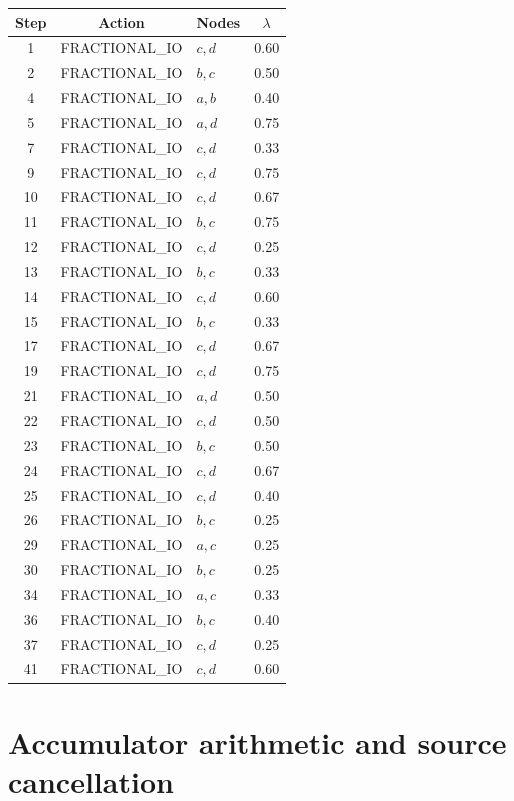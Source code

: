\documentclass[11pt]{article}
\begin{document}
\begin{longtable}{cclc}
\toprule
Step & Action & Nodes & \(\lambda\)\\
\midrule
\endhead
1  & FRACTIONAL\_IO & \(c,d\) & 0.60\\
2  & FRACTIONAL\_IO & \(b,c\) & 0.50\\
4  & FRACTIONAL\_IO & \(a,b\) & 0.40\\
5  & FRACTIONAL\_IO & \(a,d\) & 0.75\\
7  & FRACTIONAL\_IO & \(c,d\) & 0.33\\
9  & FRACTIONAL\_IO & \(c,d\) & 0.75\\
10 & FRACTIONAL\_IO & \(c,d\) & 0.67\\
11 & FRACTIONAL\_IO & \(b,c\) & 0.75\\
12 & FRACTIONAL\_IO & \(c,d\) & 0.25\\
13 & FRACTIONAL\_IO & \(b,c\) & 0.33\\
14 & FRACTIONAL\_IO & \(c,d\) & 0.60\\
15 & FRACTIONAL\_IO & \(b,c\) & 0.33\\
17 & FRACTIONAL\_IO & \(c,d\) & 0.67\\
19 & FRACTIONAL\_IO & \(c,d\) & 0.75\\
21 & FRACTIONAL\_IO & \(a,d\) & 0.50\\
22 & FRACTIONAL\_IO & \(c,d\) & 0.50\\
23 & FRACTIONAL\_IO & \(b,c\) & 0.50\\
24 & FRACTIONAL\_IO & \(c,d\) & 0.67\\
25 & FRACTIONAL\_IO & \(c,d\) & 0.40\\
26 & FRACTIONAL\_IO & \(b,c\) & 0.25\\
29 & FRACTIONAL\_IO & \(a,c\) & 0.25\\
30 & FRACTIONAL\_IO & \(b,c\) & 0.25\\
34 & FRACTIONAL\_IO & \(a,c\) & 0.33\\
36 & FRACTIONAL\_IO & \(b,c\) & 0.40\\
37 & FRACTIONAL\_IO & \(c,d\) & 0.25\\
41 & FRACTIONAL\_IO & \(c,d\) & 0.60\\
\bottomrule
\end{longtable}

\section{Accumulator arithmetic and source cancellation}
\end{document}
